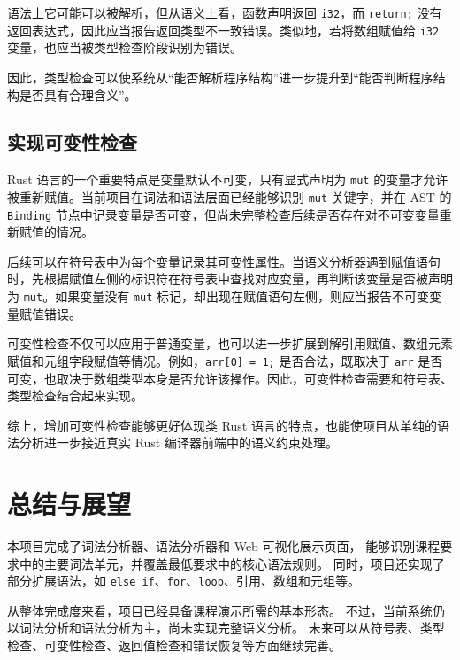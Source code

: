 \documentclass[UTF8,a4paper,12pt]{ctexart}
\begin{document}
语法上它可能可以被解析，但从语义上看，函数声明返回 \texttt{i32}，而 \texttt{return;} 没有返回表达式，因此应当报告返回类型不一致错误。类似地，若将数组赋值给 \texttt{i32} 变量，也应当被类型检查阶段识别为错误。

因此，类型检查可以使系统从“能否解析程序结构”进一步提升到“能否判断程序结构是否具有合理含义”。

\subsection{实现可变性检查}

Rust 语言的一个重要特点是变量默认不可变，只有显式声明为 \texttt{mut} 的变量才允许被重新赋值。当前项目在词法和语法层面已经能够识别 \texttt{mut} 关键字，并在 AST 的 \texttt{Binding} 节点中记录变量是否可变，但尚未完整检查后续是否存在对不可变变量重新赋值的情况。

后续可以在符号表中为每个变量记录其可变性属性。当语义分析器遇到赋值语句时，先根据赋值左侧的标识符在符号表中查找对应变量，再判断该变量是否被声明为 \texttt{mut}。如果变量没有 \texttt{mut} 标记，却出现在赋值语句左侧，则应当报告不可变变量赋值错误。

可变性检查不仅可以应用于普通变量，也可以进一步扩展到解引用赋值、数组元素赋值和元组字段赋值等情况。例如，\texttt{arr[0] = 1;} 是否合法，既取决于 \texttt{arr} 是否可变，也取决于数组类型本身是否允许该操作。因此，可变性检查需要和符号表、类型检查结合起来实现。

综上，增加可变性检查能够更好体现类 Rust 语言的特点，也能使项目从单纯的语法分析进一步接近真实 Rust 编译器前端中的语义约束处理。

\section{总结与展望}

本项目完成了词法分析器、语法分析器和 Web 可视化展示页面，
能够识别课程要求中的主要词法单元，并覆盖最低要求中的核心语法规则。
同时，项目还实现了部分扩展语法，如 \texttt{else if}、\texttt{for}、\texttt{loop}、引用、数组和元组等。

从整体完成度来看，项目已经具备课程演示所需的基本形态。
不过，当前系统仍以词法分析和语法分析为主，尚未实现完整语义分析。
未来可以从符号表、类型检查、可变性检查、返回值检查和错误恢复等方面继续完善。

\newpage
\end{document}
